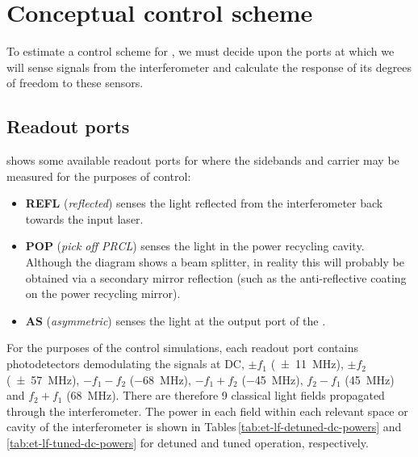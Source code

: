 
\section{Conceptual control scheme}

To estimate a control scheme for \ETLF{}, we must decide upon the ports at which we will sense signals from the interferometer and calculate the response of its degrees of freedom to these sensors.

\subsection{Readout ports}
 shows some available readout ports for \ETLF{} where the sidebands and carrier may be measured for the purposes of control:
\begin{itemize}
  \item \textbf{REFL} (\emph{reflected}) senses the light reflected from the interferometer back towards the input laser.
  \item \textbf{POP} (\emph{pick off \gls{PRCL}}) senses the light in the power recycling cavity. Although the diagram shows a beam splitter, in reality this will probably be obtained via a secondary mirror reflection (such as the anti-reflective coating on the power recycling mirror).
  \item \textbf{AS} (\emph{asymmetric}) senses the light at the output port of the \DRFPMI{}.
\end{itemize}

For the purposes of the control simulations, each readout port contains photodetectors demodulating the signals at \gls{DC}, $\pm f_1$ (\SI{\pm11}{\mega\hertz}), $\pm f_2$ (\SI{\pm57}{\mega\hertz}), $-f_1 - f_2$ (\SI{-68}{\mega\hertz}), $-f_1 + f_2$ (\SI{-45}{\mega\hertz}), $f_2 - f_1$ (\SI{45}{\mega\hertz}) and $f_2 + f_1$ (\SI{68}{\mega\hertz}). There are therefore \num{9} classical light fields propagated through the interferometer. The power in each field within each relevant space or cavity of the interferometer is shown in Tables\,\ref{tab:et-lf-detuned-dc-powers} and \ref{tab:et-lf-tuned-dc-powers} for detuned and tuned operation, respectively.

